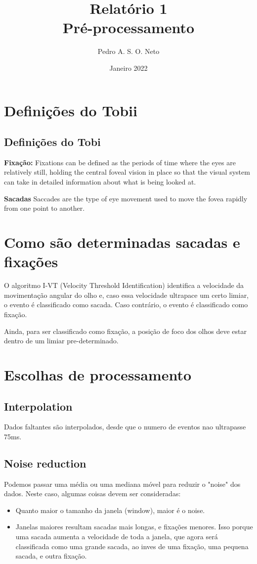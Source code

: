 \documentclass{article}
\title{Relatório 1 \\ Pré-processamento}
\author{Pedro A. S. O. Neto}
\date{Janeiro 2022}
\begin{document}
\maketitle

\section{Definições do Tobii}
\subsection{Definições do Tobi}

\textbf{Fixação:} Fixations can be defined as the periods of time where the eyes are relatively still, holding the central foveal vision in place so that the visual system can take in detailed information about what is being looked at.

\textbf{Sacadas} Saccades are the type of eye movement used to move the fovea rapidly from one point to another. 

\section{Como são determinadas sacadas e fixações}

O algoritmo I-VT (Velocity Threshold Identification) identifica a velocidade da movimentação angular do olho e, caso essa velocidade ultrapace um certo limiar, o evento é classificado como sacada. Caso contrário, o evento é classificado como fixação.

Ainda, para ser classificado como fixação, a posição de foco dos olhos deve estar dentro de um limiar pre-determinado.

\section{Escolhas de processamento}

\subsection{Interpolation}
Dados faltantes são interpolados, desde que o numero de eventos nao ultrapasse 75ms.

\subsection{Noise reduction}

Podemos passar uma média ou uma mediana móvel para reduzir o "noise" dos dados. Neste caso, algumas coisas devem ser consideradas:
\begin{itemize}
  \item Quanto maior o tamanho da janela (window), maior é o noise. 
  \item Janelas maiores resultam sacadas mais longas, e fixações menores. Isso porque uma sacada aumenta a velocidade de toda a janela, que agora será classificada como uma grande sacada, ao inves de uma fixação, uma pequena sacada, e outra fixação.
\end{itemize}
\end{document}
